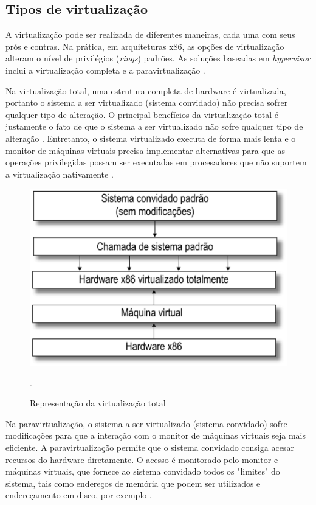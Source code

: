 \subsection{Tipos de virtualização}
A virtualização pode ser realizada de diferentes maneiras, cada uma com seus prós e contras. Na prática, em arquiteturas x86, as opções de virtualização alteram o nível de privilégios (\textit{rings}) padrões. As soluções baseadas em \textit{hypervisor} inclui a virtualização completa e a paravirtualização \cite{manoel}.

Na virtualização total, uma estrutura completa de hardware é virtualizada, portanto o sistema a ser virtualizado (sistema convidado) não precisa sofrer qualquer tipo de alteração. O principal benefícios da virtualização total é justamente o fato de que o sistema a ser virtualizado não sofre qualquer tipo de alteração \cite{marcos}. Entretanto, o sistema virtualizado executa de forma mais lenta e o monitor de máquinas virtuais precisa implementar alternativas para que as operações privilegidas possam ser executadas em procesadores que não suportem a virtualização nativamente \cite{marcos}.

\begin{figure}[!htb]
\centering
\includegraphics [keepaspectratio=true,scale=0.30]{figuras/full_virtualization.eps}
\caption{Representação da virtualização total}
\cite{marcos}.
\label{full_virtualization}
\end{figure}

Na paravirtualização, o sistema a ser virtualizado (sistema convidado) sofre modificações para que a interação com o monitor de máquinas virtuais seja mais eficiente. A paravirtualização permite que o sistema convidado consiga acesar recursos do hardware diretamente. O acesso é monitorado pelo monitor e máquinas virtuais, que fornece ao sistema convidado todos os "limites" do sistema, tais como endereços de memória que podem ser utilizados e endereçamento em disco, por exemplo \cite{marcos}.

